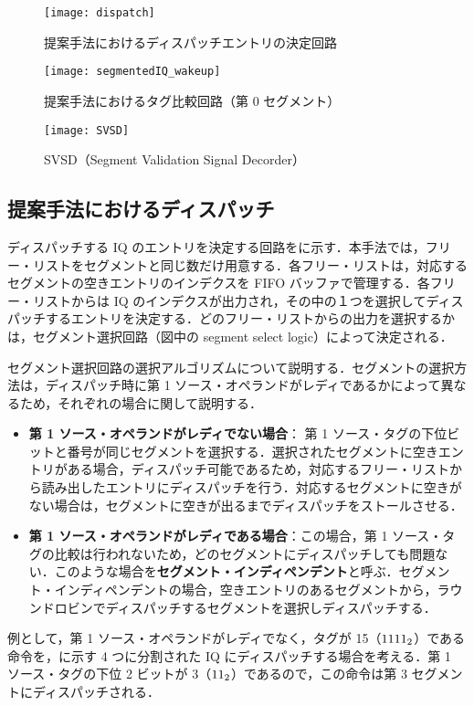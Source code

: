 \begin{figure}[tb]
  \centering
  \texttt{[image: dispatch]}
  \caption{提案手法におけるディスパッチエントリの決定回路}
  \label{fig:dispatch}
\end{figure}


\begin{figure}[htb]
  \centering
  \texttt{[image: segmentedIQ\_wakeup]}
  \caption{提案手法におけるタグ比較回路（第 0 セグメント）}
  \label{fig:segmentedIQ_wakeup}
\end{figure}

\begin{figure}[htb]
  \centering
  \texttt{[image: SVSD]}
  \caption{SVSD（Segment Validation Signal Decorder）}
  \label{fig:SVSD}
\end{figure}

\subsection{提案手法におけるディスパッチ}
ディスパッチする IQ のエントリを決定する回路をに示す．本手法では，フリー・リストをセグメントと同じ数だけ用意する．各フリー・リストは，対応するセグメントの空きエントリのインデクスを FIFO バッファで管理する．各フリー・リストからは IQ のインデクスが出力され，その中の１つを選択してディスパッチするエントリを決定する．どのフリー・リストからの出力を選択するかは，セグメント選択回路（図中の segment select logic）によって決定される．

セグメント選択回路の選択アルゴリズムについて説明する．セグメントの選択方法は，ディスパッチ時に第 1 ソース・オペランドがレディであるかによって異なるため，それぞれの場合に関して説明する．
\begin{itemize}
  \item \textbf{第 1 ソース・オペランドがレディでない場合}： 第 1 ソース・タグの下位ビットと番号が同じセグメントを選択する．選択されたセグメントに空きエントリがある場合，ディスパッチ可能であるため，対応するフリー・リストから読み出したエントリにディスパッチを行う．対応するセグメントに空きがない場合は，セグメントに空きが出るまでディスパッチをストールさせる．
  \item \textbf{第 1 ソース・オペランドがレディである場合}：この場合，第 1 ソース・タグの比較は行われないため，どのセグメントにディスパッチしても問題ない．このような場合を\textbf{セグメント・インディペンデント}と呼ぶ．セグメント・インディペンデントの場合，空きエントリのあるセグメントから，ラウンドロビンでディスパッチするセグメントを選択しディスパッチする．
\end{itemize}
例として，第 1 ソース・オペランドがレディでなく，タグが 15（${\rm 1111_2}$）である命令を，に示す 4 つに分割された IQ にディスパッチする場合を考える．第 1 ソース・タグの下位 2 ビットが 3（${\rm 11_2}$）であるので，この命令は第 3 セグメントにディスパッチされる．　

